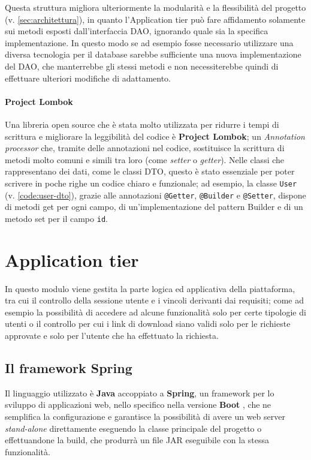 

Questa struttura migliora ulteriormente la modularità e la flessibilità del
progetto (v. \autoref{sec:architettura}), in quanto l'Application tier può
fare affidamento solamente sui metodi esposti dall'interfaccia DAO, ignorando quale
sia la specifica implementazione.
In questo modo se ad esempio fosse necessario utilizzare una diversa tecnologia
per il database sarebbe sufficiente una nuova implementazione del DAO, che
manterrebbe gli stessi metodi e non necessiterebbe quindi di effettuare ulteriori
modifiche di adattamento.

\paragraph{Project Lombok}
Una libreria open source che è stata molto utilizzata per ridurre i tempi di
scrittura e migliorare la leggibilità del codice è \textbf{Project Lombok};
un \textit{Annotation processor} che, tramite delle annotazioni nel codice,
sostituisce la scrittura di metodi molto comuni e simili tra loro (come
\textit{setter} o \textit{getter}).
Nelle classi che rappresentano dei dati, come le classi DTO, questo è stato
essenziale per poter scrivere in poche righe un codice chiaro e funzionale;
ad esempio, la classe \texttt{User} (v. \ref{code:user-dto}), grazie alle annotazioni
\texttt{@Getter}, \texttt{@Builder} e \texttt{@Setter}, dispone di metodi get
per ogni campo, di un'implementazione del pattern Builder e di un metodo set per
il campo \texttt{id}.





\section{Application tier}
In questo modulo viene gestita la parte logica ed applicativa della piattaforma,
tra cui il controllo della sessione utente e i vincoli derivanti dai requisiti;
come ad esempio la possibilità di accedere ad alcune funzionalità solo per certe
tipologie di utenti o il controllo per cui i link di download siano validi solo
per le richieste approvate e solo per l'utente che ha effettuato la richiesta. 


\subsection{Il framework Spring}
Il linguaggio utilizzato è \textbf{Java} accoppiato a \textbf{Spring},
un framework per lo sviluppo di applicazioni web, nello specifico nella versione
\textbf{Boot} \cite{spring:boot}, che ne semplifica la configurazione e garantisce
la possibilità di avere un web server \textit{stand-alone} direttamente eseguendo
la classe principale del progetto o effettuandone la build, che produrrà un file
JAR eseguibile con la stessa funzionalità.

